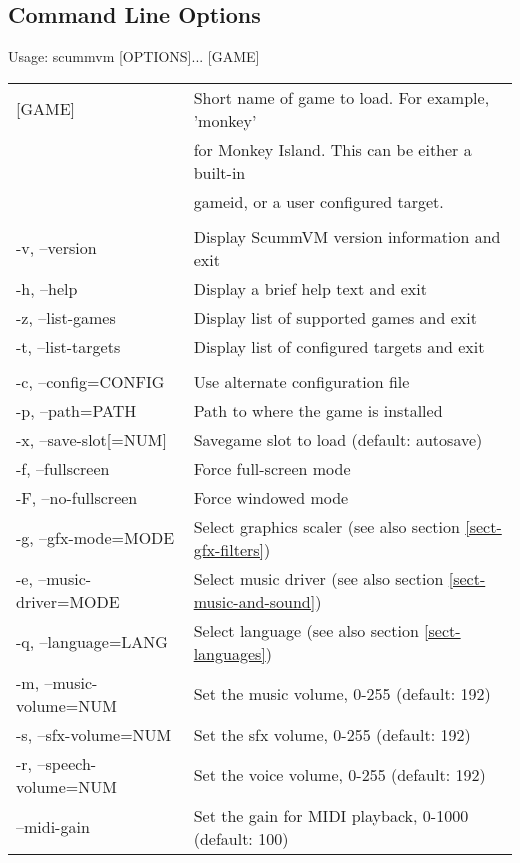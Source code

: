 


\subsection{Command Line Options}

Usage: scummvm [OPTIONS]... [GAME]\\
\begin{tabular}{ll}
  [GAME]                  &Short name of game to load. For example, 'monkey'\\
                          &for Monkey Island. This can be either a built-in\\
                          &gameid, or a user configured target.\\
\\
  -v, --version           &Display ScummVM version information and exit\\
  -h, --help              &Display a brief help text and exit\\
  -z, --list-games        &Display list of supported games and exit\\
  -t, --list-targets      &Display list of configured targets and exit\\
\\
  -c, --config=CONFIG     &Use alternate configuration file\\
  -p, --path=PATH         &Path to where the game is installed\\
  -x, --save-slot[=NUM]   &Savegame slot to load (default: autosave)\\
  -f, --fullscreen        &Force full-screen mode\\
  -F, --no-fullscreen     &Force windowed mode\\
  -g, --gfx-mode=MODE     &Select graphics scaler (see also section \ref{sect-gfx-filters})\\
  -e, --music-driver=MODE &Select music driver (see also section \ref{sect-music-and-sound})\\
  -q, --language=LANG     &Select language (see also section \ref{sect-languages})\\
  -m, --music-volume=NUM  &Set the music volume, 0-255 (default: 192)\\
  -s, --sfx-volume=NUM    &Set the sfx volume, 0-255 (default: 192)\\
  -r, --speech-volume=NUM &Set the voice volume, 0-255 (default: 192)\\
  --midi-gain             &Set the gain for MIDI playback, 0-1000 (default: 100)\\

\end{tabular}
